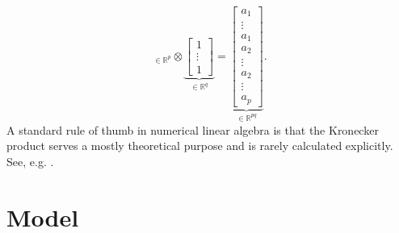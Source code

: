 \documentclass{article}
\begin{document}
\begin{itemize}
$${        }_{\in \mathbb{R}^{p}}
        \otimes 
        \underbrace{
        \begin{bmatrix}
            1 \\
            \vdots \\
            1
        \end{bmatrix}
        }_{\in \mathbb{R}^{q}}
        =
        \underbrace{
        \begin{bmatrix}
            a_1 \\
            \vdots \\
            a_1 \\
            a_2 \\
            \vdots \\
            a_2 \\
            \vdots \\
            a_p
        \end{bmatrix}
        }_{\in \mathbb{R}^{pq}}
        .$$
        A standard rule of thumb in numerical linear algebra is that the Kronecker product serves a mostly theoretical purpose and is rarely calculated explicitly. See, e.g. \cite[Section 12.3]{Golub2013}.
\end{itemize}

\section{Model}
\end{document}
